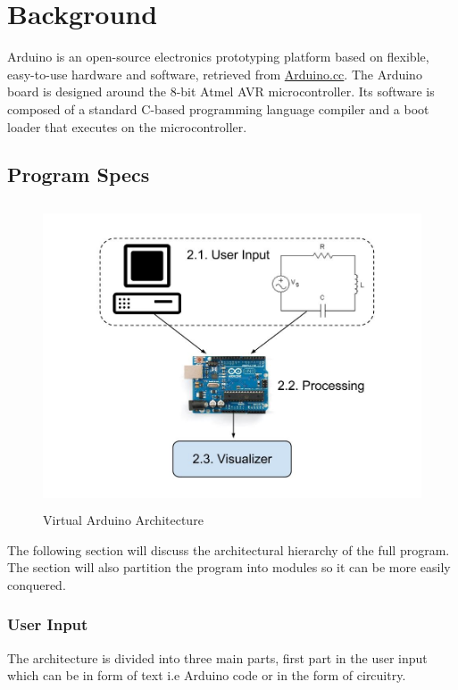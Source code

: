 
\chapter{Background}

Arduino is an open-source electronics prototyping platform based on flexible, easy-to-use hardware and software, retrieved from \href{http://arduino.cc/en/}{Arduino.cc}. The Arduino board is designed around the 8-bit Atmel AVR microcontroller. Its software is composed of a standard C-based programming language compiler and a boot loader that executes on the microcontroller.



\section{Program Specs}

\begin{figure}[h!]
\centering
\includegraphics[height=9cm, width=12cm]{Hierarchy.jpg}
\caption{Virtual Arduino Architecture}
\label{Architecture}
\end{figure}
The following section will discuss the architectural hierarchy of the full program. The section will also partition the program into modules so it can be more easily conquered. 

\subsection{User Input}
The architecture is divided into three main parts, first part in the user input which can be in form  of text i.e Arduino code or in the form of circuitry.

